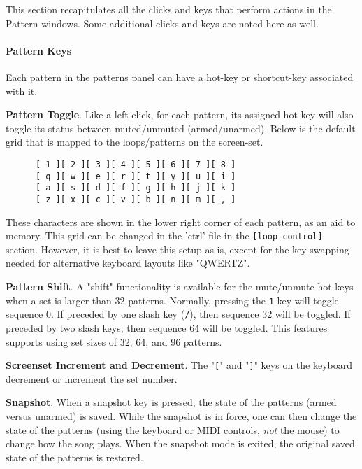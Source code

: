    This section recapitulates all the clicks and keys that perform actions
   in the Pattern windows.  Some additional clicks and keys are noted here
   as well.

\paragraph{Pattern Keys}
\label{paragraph:patterns_pattern_keys}

   Each pattern in the patterns panel can have a hot-key or shortcut-key
   associated with it.

   \textbf{Pattern Toggle}.
   Like a left-click, for each pattern, its assigned hot-key will
   also toggle its status between muted/unmuted (armed/unarmed).
   Below is the default grid that is
   mapped to the loops/patterns on the screen-set.

   \begin{verbatim}
      [ 1 ][ 2 ][ 3 ][ 4 ][ 5 ][ 6 ][ 7 ][ 8 ]
      [ q ][ w ][ e ][ r ][ t ][ y ][ u ][ i ]
      [ a ][ s ][ d ][ f ][ g ][ h ][ j ][ k ]
      [ z ][ x ][ c ][ v ][ b ][ n ][ m ][ , ]
   \end{verbatim}

   These characters are shown in the lower right corner of each
   pattern, as an aid to memory.
   This grid can be changed in the 'ctrl' file in the
   \texttt{[loop-control]} section.
   However, it is best to leave this setup as is, except for the key-swapping
   needed for alternative keyboard layouts like "QWERTZ".

   \textbf{Pattern Shift}.
   A "shift" functionality is available for the
   mute/unmute hot-keys when a set is larger than 32 patterns.
   Normally, pressing the \texttt{1} key will toggle
   sequence 0.  If preceded by one slash key (\texttt{/}), then sequence 32
   will be toggled.  If preceded by two slash keys, then sequence 64 will be
   toggled.  This features supports using set sizes of 32, 64, and 96 patterns.

   \index{keys![}
   \textbf{Screenset Increment and Decrement}.
   The "\texttt{[}" and
   \index{keys!]}
   "\texttt{]}" keys on the keyboard decrement or increment the set number.

   \textbf{Snapshot}.
   When a snapshot key is pressed, the state of the patterns
   (armed versus unarmed) is saved.  While the
   snapshot is in force, one can then change the state of the patterns
   (using the keyboard or MIDI controls, \textsl{not} the mouse)
   to change how the song plays.  When the snapshot mode is exited, the
   original saved state of the patterns is restored.


